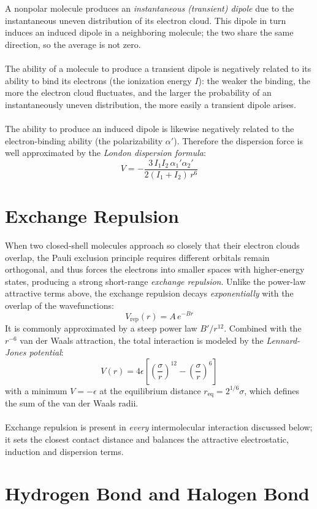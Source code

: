 		A nonpolar molecule produces an \emph{instantaneous (transient) dipole} due to the instantaneous uneven distribution of its electron cloud.
		This dipole in turn induces an induced dipole in a neighboring molecule; the two share the same direction, so the average is not zero. \\\ \\
		The ability of a molecule to produce a transient dipole is negatively related to its ability to bind its electrons (the ionization energy $I$): the weaker the binding, the more the electron cloud fluctuates, and the larger the probability of an instantaneously uneven distribution, the more easily a transient dipole arises. \\ \\
		The ability to produce an induced dipole is likewise negatively related to the electron-binding ability (the polarizability $\alpha'$).
		Therefore the dispersion force is well approximated by the \emph{London dispersion formula}:
		\[\boxed{V = -\frac{3\,I_1 I_2\,\alpha_1'\alpha_2'}{2(I_1+I_2)\,r^{6}}}\]

\section{Exchange Repulsion}\label{exchange}

	When two closed-shell molecules approach so closely that their electron clouds overlap, the Pauli exclusion principle requires different orbitals remain orthogonal, and thus forces the electrons into smaller spaces with higher-energy states, producing a strong short-range \emph{exchange repulsion}. 
	Unlike the power-law attractive terms above, the exchange repulsion decays \emph{exponentially} with the overlap of the wavefunctions:
	\[V_{\text{rep}}(r) = A\,e^{-Br}\]
	It is commonly approximated by a steep power law $B'/r^{12}$. Combined with the $r^{-6}$ van der Waals attraction, the total interaction is modeled by the \emph{Lennard-Jones potential}:
	\[\boxed{V(r) = 4\epsilon\left[\left(\frac{\sigma}{r}\right)^{12} - \left(\frac{\sigma}{r}\right)^{6}\right]}\]
	with a minimum $V = -\epsilon$ at the equilibrium distance $r_{\text{eq}} = 2^{1/6}\sigma$, which defines the sum of the van der Waals radii. \\\ \\
	Exchange repulsion is present in \emph{every} intermolecular interaction discussed below; it sets the closest contact distance and balances the attractive electrostatic, induction and dispersion terms.
\section{Hydrogen Bond and Halogen Bond}
